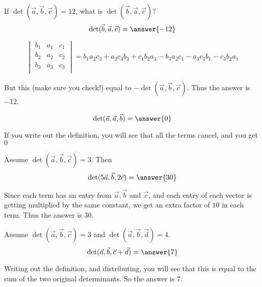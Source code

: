 

\begin{question}
  If $\det(\vec{a},\vec{b},\vec{c}) = 12$, what is
  $\det(\vec{b},\vec{a},\vec{c})$?
  \[
  \det(\vec{b},\vec{a},\vec{c}) = \answer{-12}
  \]
  \begin{hint}
    \[
    \begin{vmatrix} 
      b_1 & a_1 & c_1\\
      b_2 & a_2 & c_2\\
      b_3 & a_3 & c_3\\
    \end{vmatrix}
    =b_1a_2c_3+a_2c_3b_3+c_1b_2a_3-b_3a_2c_1-a_3c_3b_1-c_3b_2a_1
    \]
    
    But this (make sure you check!) equal to
    $-\det(\vec{a},\vec{b},\vec{c})$.  Thus the answer is $-12$.
  \end{hint}
\end{question}

\begin{question}
  \[
  \det(\vec{a},\vec{a},\vec{b}) = \answer{0}
  \]
  \begin{hint}
    If you write out the definition, you will see that all the terms cancel, and you get $0$
  \end{hint}
\end{question}
	
\begin{question}
  Assume $\det(\vec{a},\vec{b},\vec{c}) = 3$.  Then 
  \[
  \det(5\vec{a},\vec{b},2\vec{c}) = \answer{30}
  \]
  \begin{hint}
    Since each term has an entry from $\vec{a},\vec{b}$ and $\vec{c}$,
    and each entry of each vector is getting multiplied by the same
    constant, we get an extra factor of $10$ in each term.  Thus the
    answer is $30$.
  \end{hint}
\end{question}

\begin{question}
  Assume $\det(\vec{a},\vec{b},\vec{c}) = 3$ and
  $\det(\vec{a},\vec{b},\vec{d}) = 4$.
  \[
  \det(\vec{a},\vec{b},\vec{c}+\vec{d}) = \answer{7}
  \]
  
  \begin{hint}
    Writing out the definition, and distributing, you will see that
    this is equal to the sum of the two original determinants.  So the
    answer is $7$.
  \end{hint}
\end{question}

